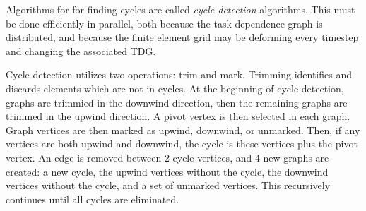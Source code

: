 \documentclass[11pt, letterpaper,titlepage,oneside]{article}
\begin{document}
Algorithms for for finding cycles are called \textit{cycle detection} algorithms. This must be done efficiently in parallel, both because the task dependence graph is distributed, and because the finite element grid may be deforming every timestep and changing the associated TDG.

Cycle detection utilizes two operations: trim and mark. Trimming identifies and discards elements which are not in cycles. At the beginning of cycle detection, graphs are trimmied in the downwind direction, then the remaining graphs are trimmed in the upwind direction. A pivot vertex is then selected in each graph. Graph vertices are then marked as upwind, downwind, or unmarked. Then, if any vertices are both upwind and downwind, the cycle is these vertices plus the pivot vertex. An edge is removed between 2 cycle vertices, and 4 new graphs are created: a new cycle, the upwind vertices without the cycle, the downwind vertices without the cycle, and a set of unmarked vertices. This recursively continues until all cycles are eliminated.
\end{document}
